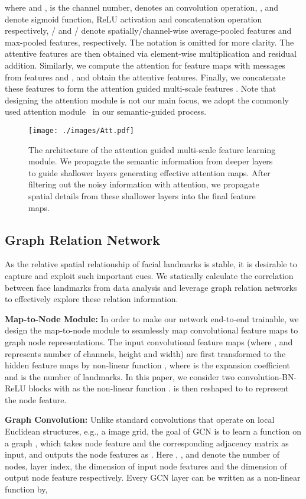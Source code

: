 \documentclass[runningheads]{llncs}
\begin{document}
where  and ,   is the channel number,  denotes an  convolution operation, ,  and  denote sigmoid function, ReLU activation and concatenation operation respectively, / and / denote spatially/channel-wise average-pooled features and max-pooled features, respectively. 
The notation  is omitted for more clarity.
The attentive features are then obtained via element-wise multiplication and residual addition.
Similarly, we compute the attention for feature maps  with messages from features  and , and obtain the attentive features.
Finally, we concatenate these features to form the attention guided multi-scale features .
Note that designing the attention module is not our main focus, we adopt the commonly used attention module~\cite{cbam} in our semantic-guided process.


\begin{figure}[t]
	\centering
	\texttt{[image: ./images/Att.pdf]}
	\caption{The architecture of the attention guided multi-scale feature learning module. We propagate the semantic information from deeper layers to guide shallower layers generating effective attention maps. After filtering out the noisy information with attention, we propagate spatial details from these shallower layers into the final feature maps.}
	\label{fig:multifeat}
\end{figure}


\subsection{Graph Relation Network}
As the relative spatial relationship of facial landmarks is stable, it is desirable to capture and exploit such important cues.
We statically calculate the correlation between face landmarks from data analysis and leverage graph relation networks to effectively explore these relation information. 

\textbf{Map-to-Node Module:} 
In order to make our network end-to-end trainable, we design the map-to-node
module to seamlessly map convolutional feature maps to graph node representations.
The input convolutional feature maps  (where ,  and  represents number of channels, height and width) are first transformed to the hidden feature maps by non-linear function , where  is the expansion coefficient and  is the number of landmarks.  
In this paper, we consider two convolution-BN-ReLU blocks with  as the non-linear function .
 is then reshaped to  to represent the node feature.

\textbf{Graph Convolution:} Unlike standard convolutions that operate on local Euclidean structures, e.g., a image grid, the goal of GCN is to learn a function  on a graph  , which takes node feature  and the corresponding adjacency matrix  as input, and outputs the node features as . 
Here , ,  and  denote the number of nodes, layer index, the dimension of input node features and the dimension of output node feature respectively.
Every GCN layer can be written as a non-linear function by,
\end{document}
